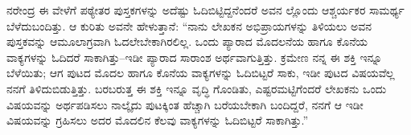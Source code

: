 ನರೇಂದ್ರ ಈ ವೇಳೆಗೆ ಪಠ್ಯೇತರ ಪುಸ್ತಕಗಳನ್ನು ಅದೆಷ್ಟು ಓದಿಬಿಟ್ಟಿದ್ದನೆಂದರೆ ಅವನ ಲ್ಲೊಂದು ಆಶ್ಚರ್ಯಕರ ಸಾಮರ್ಥ್ಯ ಬೆಳೆದುಬಂದಿತ್ತು. ಆ ಕುರಿತು ಅವನೇ ಹೇಳುತ್ತಾನೆ: “ನಾನು ಲೇಖಕನ ಅಭಿಪ್ರಾಯಗಳನ್ನು ತಿಳಿಯಲು ಅವನ ಪುಸ್ತಕವನ್ನು ಆಮೂಲಾಗ್ರವಾಗಿ ಓದಲೇಬೇಕಾಗಿರಲಿಲ್ಲ. ಒಂದು ಪ್ಯಾರಾದ ಮೊದಲನೆಯ ಹಾಗೂ ಕೊನೆಯ ವಾಕ್ಯಗಳನ್ನು ಓದಿದರೆ ಸಾಕಾಗಿತ್ತು–ಇಡೀ ಪ್ಯಾರಾದ ಸಾರಾಂಶ ಅರ್ಥವಾಗುತ್ತಿತ್ತು. ಕ್ರಮೇಣ ನನ್ನ ಈ ಶಕ್ತಿ ಇನ್ನೂ ಬೆಳೆಯಿತು; ಆಗ ಪುಟದ ಮೊದಲ ಹಾಗೂ ಕೊನೆಯ ವಾಕ್ಯಗಳನ್ನು ಓದಿಬಿಟ್ಟರೆ ಸಾಕು, ಇಡೀ ಪುಟದ ವಿಷಯವೆಲ್ಲ ನನಗೆ ತಿಳಿದುಬಿಡುತ್ತಿತ್ತು. ಬರಬರುತ್ತ ಈ ಶಕ್ತಿ ಇನ್ನೂ ವೃದ್ಧಿ ಗೊಂಡಿತು, ಎಷ್ಟರಮಟ್ಟಿಗೆಂದರೆ ಲೇಖಕನು ಒಂದು ವಿಷಯವನ್ನು ಅರ್ಥಪಡಿಸಲು ನಾಲ್ಕೈದು ಪುಟಕ್ಕಿಂತ ಹೆಚ್ಚಾಗಿ ಬರೆಯಬೇಕಾಗಿ ಬಂದಿದ್ದರೆ, ನನಗೆ ಆ ಇಡೀ ವಿಷಯವನ್ನು ಗ್ರಹಿಸಲು ಅದರ ಮೊದಲಿನ ಕೆಲವು ವಾಕ್ಯಗಳನ್ನು ಓದಿಬಿಟ್ಟರೆ ಸಾಕಾಗಿತ್ತು.”

